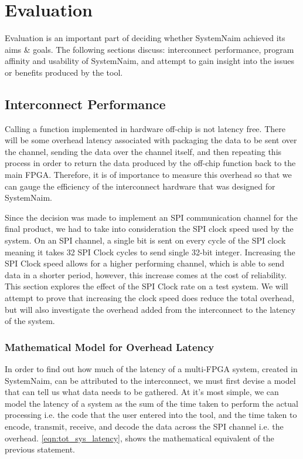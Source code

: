 \chapter{Evaluation}
\label{chp:eval}

Evaluation is an important part of deciding whether SystemNaim achieved its aims \& goals. The following sections discuss: interconnect performance, program affinity and usability of SystemNaim, and attempt to gain insight into the issues or benefits produced by the tool.

\section{Interconnect Performance}
\label{sec:interconnect}

Calling a function implemented in hardware off-chip is not latency free. There will be some overhead latency associated with packaging the data to be sent over the channel, sending the data over the channel itself, and then repeating this process in order to return the data produced by the off-chip function back to the main FPGA. Therefore, it is of importance to measure this overhead so that we can gauge the efficiency of the interconnect hardware that was designed for SystemNaim.

Since the decision was made to implement an SPI communication channel for the final product, we had to take into consideration the SPI clock speed used by the system. On an SPI channel, a single bit is sent on every cycle of the SPI clock meaning it takes 32 SPI Clock cycles to send single 32-bit integer. Increasing the SPI Clock speed allows for a higher performing channel, which is able to send data in a shorter period, however, this increase comes at the cost of reliability. This section explores the effect of the SPI Clock rate on a test system. We will attempt to prove that increasing the clock speed does reduce the total overhead, but will also investigate the overhead added from the interconnect to the latency of the system.

\subsection{Mathematical Model for Overhead Latency}

In order to find out how much of the latency of a multi-FPGA system, created in SystemNaim, can be attributed to the interconnect, we must first devise a model that can tell us what data needs to be gathered. At it's most simple, we can model the latency of a system as the sum of the time taken to perform the actual processing i.e. the code that the user entered into the tool, and the time taken to encode, transmit, receive, and decode the data across the SPI channel i.e. the overhead. \autoref{eqn:tot_sys_latency}, shows the mathematical equivalent of the previous statement.

